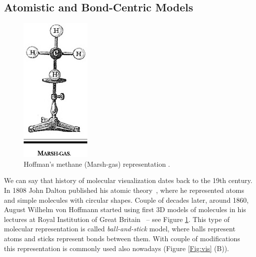 \subsection{Atomistic and Bond-Centric Models}
\begin{figure} 
\vspace{-63pt}
  \begin{center}
  \includegraphics[width=0.65\linewidth]{pictures/04_hoffman.jpg} 
  \caption{Hoffman's methane (Marsh-gas) representation \cite{perkins2005history}.}
  \label{Fig:hoffman}  
\end{center}
  \vspace{-30pt}
\end{figure}

We can say that history of molecular visualization dates back to the 19th century. In 1808 John Dalton published his atomic theory~\cite{dalton1808new}, where he represented atoms and simple molecules with circular shapes. Couple of decades later, around 1860, August Wilhelm von Hoffmann started using first 3D models of molecules in his lectures at Royal Institution of Great Britain~\cite{perkins2005history} -- see Figure \ref{Fig:hoffman}. This type of molecular representation is called \textit{ball-and-stick} model, where balls represent atoms and sticks represent bonds between them. With couple of modifications this representation is commonly used also nowadays (Figure \ref{Fig:vis} (B)). 

